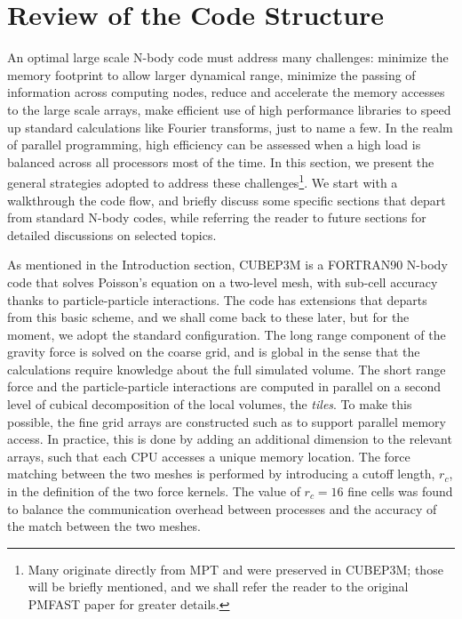 \documentclass[useAMS,usenatbib]{mn2e}
\begin{document}
\section{Review of the Code Structure}
\label{sec:structure}


An optimal large scale N-body code must address many challenges: minimize the memory footprint to allow larger dynamical range,
minimize the passing of information across computing nodes, reduce and accelerate the memory accesses to the large scale arrays, 
make efficient use of high performance libraries to speed up standard calculations like Fourier transforms, just to name a few.
In the realm of parallel programming, high efficiency  can be assessed when a high load is balanced across all processors
most of the time. In this section, we present the general strategies adopted to address these challenges\footnote{ 
Many originate directly from MPT and were preserved in {\small CUBEP3M};
those will be briefly mentioned, and we shall refer the reader to the original {\small PMFAST} paper for greater details.}.
We start with a walkthrough the code flow, and briefly discuss some specific sections that depart from standard N-body codes,
while referring the reader to future sections for detailed discussions on selected topics.


As mentioned in the Introduction section, {\small CUBEP3M} is a {\small FORTRAN90} 
N-body code that solves Poisson's equation on a two-level mesh, 
with sub-cell accuracy thanks to particle-particle interactions. 
The code has extensions that departs from this basic scheme, and
we shall come back to these later, but for the moment, we adopt the 
standard configuration. 
The long range component of the gravity force is solved on the coarse grid, 
and is global in the sense that the calculations require knowledge about the full simulated volume.
The short range force and the particle-particle interactions are computed in parallel on
a second level of cubical decomposition of the local volumes, the {\it tiles}. To make this possible, the fine grid arrays are constructed such as to support parallel memory access. In practice, this is done by adding an additional dimension to the relevant arrays, such that each {\small CPU} accesses a unique memory location. The force matching between the two meshes is performed by introducing a cutoff length, $r_{c}$, in the definition of the two force kernels. The value of $r_{c}=16$ fine cells was found to balance the communication 
overhead between processes and the accuracy of the match between the two meshes. 
\end{document}
